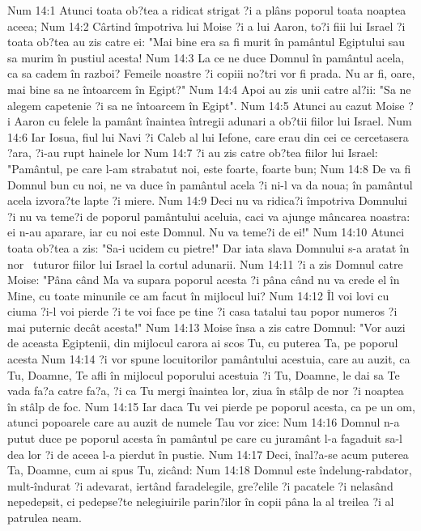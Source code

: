 Num 14:1  Atunci toata ob?tea a ridicat strigat ?i a plâns poporul toata noaptea aceea;
Num 14:2  Cârtind împotriva lui Moise ?i a lui Aaron, to?i fiii lui Israel ?i toata ob?tea au zis catre ei: "Mai bine era sa fi murit în pamântul Egiptului sau sa murim în pustiul acesta!
Num 14:3  La ce ne duce Domnul în pamântul acela, ca sa cadem în razboi? Femeile noastre ?i copiii no?tri vor fi prada. Nu ar fi, oare, mai bine sa ne întoarcem în Egipt?"
Num 14:4  Apoi au zis unii catre al?ii: "Sa ne alegem capetenie ?i sa ne întoarcem în Egipt".
Num 14:5  Atunci au cazut Moise ?i Aaron cu felele la pamânt înaintea întregii adunari a ob?tii fiilor lui Israel.
Num 14:6  Iar Iosua, fiul lui Navi ?i Caleb al lui Iefone, care erau din cei ce cercetasera ?ara, ?i-au rupt hainele lor
Num 14:7  ?i au zis catre ob?tea fiilor lui Israel: "Pamântul, pe care l-am strabatut noi, este foarte, foarte bun;
Num 14:8  De va fi Domnul bun cu noi, ne va duce în pamântul acela ?i ni-l va da noua; în pamântul acela izvora?te lapte ?i miere.
Num 14:9  Deci nu va ridica?i împotriva Domnului ?i nu va teme?i de poporul pamântului aceluia, caci va ajunge mâncarea noastra: ei n-au aparare, iar cu noi este Domnul. Nu va teme?i de ei!"
Num 14:10  Atunci toata ob?tea a zis: "Sa-i ucidem cu pietre!" Dar iata slava Domnului s-a aratat în nor  tuturor fiilor lui Israel la cortul adunarii.
Num 14:11  ?i a zis Domnul catre Moise: "Pâna când Ma va supara poporul acesta ?i pâna când nu va crede el în Mine, cu toate minunile ce am facut în mijlocul lui?
Num 14:12  Îl voi lovi cu ciuma ?i-l voi pierde ?i te voi face pe tine ?i casa tatalui tau popor numeros ?i mai puternic decât acesta!"
Num 14:13  Moise însa a zis catre Domnul: "Vor auzi de aceasta Egiptenii, din mijlocul carora ai scos Tu, cu puterea Ta, pe poporul acesta
Num 14:14  ?i vor spune locuitorilor pamântului acestuia, care au auzit, ca Tu, Doamne, Te afli în mijlocul poporului acestuia ?i Tu, Doamne, le dai sa Te vada fa?a catre fa?a, ?i ca Tu mergi înaintea lor, ziua în stâlp de nor ?i noaptea în stâlp de foc.
Num 14:15  Iar daca Tu vei pierde pe poporul acesta, ca pe un om, atunci popoarele care au auzit de numele Tau vor zice:
Num 14:16  Domnul n-a putut duce pe poporul acesta în pamântul pe care cu juramânt l-a fagaduit sa-l dea lor ?i de aceea l-a pierdut în pustie.
Num 14:17  Deci, înal?a-se acum puterea Ta, Doamne, cum ai spus Tu, zicând:
Num 14:18  Domnul este îndelung-rabdator, mult-îndurat ?i adevarat, iertând faradelegile, gre?elile ?i pacatele ?i nelasând nepedepsit, ci pedepse?te nelegiuirile parin?ilor în copii pâna la al treilea ?i al patrulea neam.
